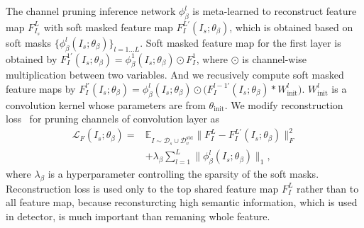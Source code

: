 \documentclass[letterpaper]{article} %
\begin{document}
The channel pruning inference network $\phi^l_\beta$ is meta-learned to reconstruct feature map $F^L_{I_s}$ with soft masked feature map $F^{L\prime}_I(I_s;\theta_\beta)$, which is obtained based on soft masks $\{\phi^l_\beta(I_s;\theta_\beta)\}_{l=1...L}$. 
Soft masked feature map for the first layer is obtained by $F^{1\prime}_I(I_s;\theta_\beta)=\phi^1_\beta(I_s;\theta_\beta)\odot F^1_I$, where $\odot$ is channel-wise multiplication between two variables. And we recusively compute soft masked feature maps by
$F^{l\prime}_I(I_s;\theta_\beta)=\phi^l_\beta(I_s;\theta_\beta)\odot\big(F^{l-1\prime}_I(I_s;\theta_\beta)*W^l_\text{init}\big)$. $W^{l}_\text{init}$ is a convolution kernel whose parameters are from $\theta_\text{init}$.
We modify reconstruction loss~\cite{lassoprune} for pruning channels of convolution layer as
\begin{equation}\label{conv_prune_loss}
\begin{aligned} 
\mathcal{L}_F(I_{s};\theta_{\beta}) =&  \mathbb{E}_{I\sim \mathcal{D}_s \cup \mathcal{D}_v^\text{std}}
    \big\lVert  F^{L}_I - F^{L\prime}_I(I_s;\theta_\beta) \big\rVert^{2}_{F} \\
&\textstyle+\lambda_{\beta} \sum_{l=1}^{L}\big\lVert \phi^l_\beta(I_s;\theta_\beta) \big\rVert_{1},
\end{aligned}
\end{equation}
where $\lambda_\beta$ is a hyperparameter controlling the sparsity of the soft masks.
Reconstruction loss is used only to the top shared feature map $F^L_I$ rather than to all feature map, because reconsturcting high semantic information, which is used in detector, is much important than remaning whole feature. 


\end{document}
